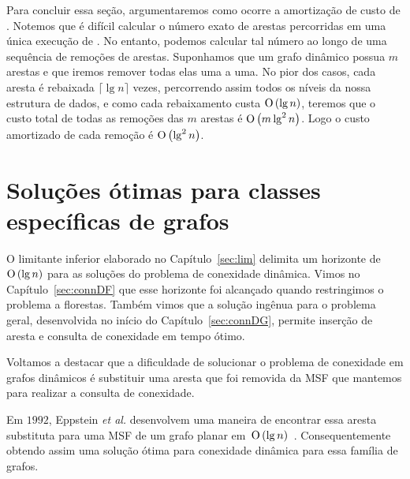 Para concluir essa seção, argumentaremos como ocorre a amortização de custo de \dymGraphDelEdge{}. Notemos que é difícil calcular o número exato de arestas percorridas em uma única execução de \dymGraphReplace{}. No entanto, podemos calcular tal número ao longo de uma sequência de remoções de arestas. Suponhamos que um grafo dinâmico possua $m$ arestas e que iremos remover todas elas uma a uma. No pior dos casos, cada aresta é rebaixada $\lceil \lg n \rceil$ vezes, percorrendo assim todos os níveis da nossa estrutura de dados, e como cada rebaixamento custa $\text{O}\left(\lg n\right)$, teremos que o custo total de todas as remoções das $m$ arestas é $\text{O}\left(m\lg^2 n\right)$. Logo o custo amortizado de cada remoção é $\text{O}\left(\lg^2 n\right)$.






\section{Soluções ótimas para classes específicas de grafos}

O limitante inferior elaborado no Capítulo~\ref{sec:lim} delimita um horizonte de~$\text{O}\left(\lg n\right)$ para as soluções do problema de conexidade dinâmica. Vimos no Capítulo~\ref{sec:connDF} que esse horizonte foi alcançado quando restringimos o problema a florestas. Também vimos que a solução ingênua para o problema geral, desenvolvida no início do Capítulo~\ref{sec:connDG}, permite inserção de aresta e consulta de conexidade em tempo ótimo.

Voltamos a destacar que a dificuldade de solucionar o problema de conexidade em grafos dinâmicos é substituir uma aresta que foi removida da MSF que mantemos para realizar a consulta de conexidade.

Em $1992$, Eppstein \textit{et al.} desenvolvem uma maneira de encontrar essa aresta substituta para uma MSF de um grafo planar em~$\text{O}\left(\lg n\right)$~\cite{EPPSTEIN-planar}. Consequentemente obtendo assim uma solução ótima para conexidade dinâmica para essa família de grafos.


